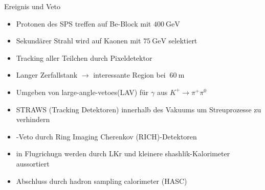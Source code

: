 \documentclass[aspectratio=1610, professionalfonts, 9pt, t]{beamer}
\begin{document}
  \begin{frame}{Ereignis und Veto}
    \begin{itemize}
      \item Protonen des SPS treffen auf Be-Block mit $\SI{400}{\giga\electronvolt}$
      \item Sekundärer Strahl wird auf Kaonen mit $\SI{75}{\giga\electronvolt}$ selektiert
      \item[\rightarrow] Tracking aller Teilchen durch Pixeldetektor%
      \item Langer Zerfallstank $\rightarrow$ interessante Region bei $~ \SI{60}{\metre}$
      \item[\rightarrow] Umgeben von large-angle-vetoes(LAV) für $\gamma$ aus $K^+ \rightarrow \pi^+ \pi^0$
      \item STRAWS (Tracking Detektoren) innerhalb des Vakuums um Streuprozesse zu verhindern %
      \item \mu-Veto durch Ring Imaging Cherenkov (RICH)-Detektoren
      \item \gamma in Flugrichugn werden durch LKr und kleinere shashlik-Kalorimeter aussortiert
      \item Abschluss durch hadron sampling calorimeter (HASC)
    \end{itemize}
  \end{frame}
\end{document}
